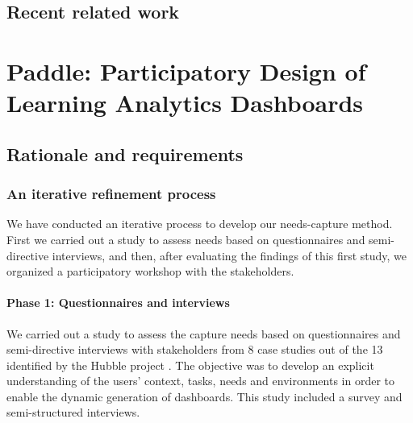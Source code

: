 \documentclass[preprint,12pt]{elsarticle}
\begin{document}
\subsection{Recent related work}


\section{Paddle: Participatory Design of Learning Analytics Dashboards}
\subsection{Rationale and requirements}
\subsubsection{An iterative refinement process}
\label{sec:dimensions}
We have conducted an iterative process to develop our needs-capture method. First we carried out a study to assess needs based on questionnaires and semi-directive interviews, and then, after evaluating  the findings of this first study, we organized a participatory workshop with the stakeholders.


\paragraph{Phase 1: Questionnaires and interviews}
We carried out a study to assess the capture needs based on questionnaires and semi-directive interviews with stakeholders from 8 case studies out of the 13 identified by the Hubble project \cite{dabbebi2017towards}. 
The objective was to develop an explicit understanding of the users' context, tasks, needs and environments in order to enable the dynamic generation of dashboards. This study included a survey and semi-structured interviews.
\end{document}
